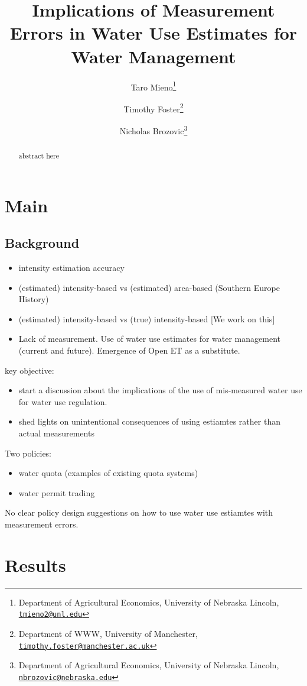 \documentclass[
]{article}
\title{Implications of Measurement Errors in Water Use Estimates for Water Management}
\author{Taro Mieno\footnote{Department of Agricultural Economics, University of Nebraska Lincoln, \href{mailto:tmieno2@unl.edu}{\nolinkurl{tmieno2@unl.edu}}} \and Timothy Foster\footnote{Department of WWW, University of Manchester, \href{mailto:timothy.foster@manchester.ac.uk}{\nolinkurl{timothy.foster@manchester.ac.uk}}} \and Nicholas Brozovic\footnote{Department of Agricultural Economics, University of Nebraska Lincoln, \href{mailto:nbrozovic@nebraska.edu}{\nolinkurl{nbrozovic@nebraska.edu}}}}
\date{}
\providecommand{\tightlist}{%
  \setlength{\itemsep}{0pt}\setlength{\parskip}{0pt}}
\begin{document}
\maketitle
\begin{abstract}
abstract here
\end{abstract}

\newpage

\section{Main}\label{main}

\subsection{Background}\label{background}

\begin{itemize}
\item
  intensity estimation accuracy
\item
  (estimated) intensity-based vs (estimated) area-based (Southern Europe History)
\item
  (estimated) intensity-based vs (true) intensity-based {[}We work on this{]}
\item
  Lack of measurement. Use of water use estimates for water management (current and future). Emergence of Open ET as a substitute.
\end{itemize}

key objective:

\begin{itemize}
\item
  start a discussion about the implications of the use of mis-measured water use for water use regulation.
\item
  shed lights on unintentional consequences of using estiamtes rather than actual measurements
\end{itemize}

Two policies:

\begin{itemize}
\tightlist
\item
  water quota (examples of existing quota systems)
\item
  water permit trading
\end{itemize}

No clear policy design suggestions on how to use water use estiamtes with measurement errors.

\section{Results}\label{results}
\end{document}
